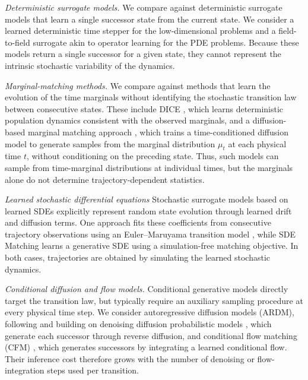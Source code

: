 \documentclass[oneside,11pt]{article}
\theoremstyle{remark}
\begin{document}
\emph{Deterministic surrogate models.}
We compare against deterministic surrogate models that learn a single successor state from the current state. We consider a learned deterministic time stepper \cite{otness2021an} for the low-dimensional problems and a field-to-field surrogate akin to operator learning \cite{stachenfeld2021learned} for the PDE problems. Because these models return a single successor for a given state, they cannot represent the intrinsic stochastic variability of the dynamics.

\emph{Marginal-matching methods.}
We compare against methods that learn the evolution of the time marginals without identifying the stochastic transition law between consecutive states. These include DICE \cite{blickhan-berman-stuart-etal:2025}, which learns deterministic population
dynamics consistent with the observed marginals, and a diffusion-based marginal matching approach \cite{ho2020denoising}, which trains a time-conditioned
diffusion model to generate samples from the marginal distribution $\mu_t$ at each
physical time $t$, without conditioning on the preceding state. Thus, such models can sample from time-marginal distributions at individual times, but the marginals alone do not determine trajectory-dependent statistics.

\emph{Learned stochastic differential equations}
Stochastic surrogate models based on learned SDEs explicitly represent random state evolution through learned drift and diffusion terms. One approach fits these coefficients from consecutive trajectory observations using an Euler--Maruyama transition model \cite{dridi2021learning}, while SDE Matching \cite{bartosh2025sdematching} learns a generative SDE using a simulation-free matching objective. In both cases, trajectories are obtained by simulating the learned stochastic dynamics.

\emph{Conditional diffusion and flow models.}
Conditional generative models directly target the transition law, but typically require an auxiliary sampling procedure at every physical time step. We consider autoregressive diffusion models (ARDM), following
\cite{KOHL2026108641} and building on denoising diffusion probabilistic models \cite{ho2020denoising}, which generate each successor through reverse diffusion, and conditional flow matching (CFM) \cite{albergo-vanden-eijnden:2022,lipman2023flow}, which generates successors by integrating a learned conditional flow. Their inference cost therefore grows with the number of denoising or flow-integration steps used per transition.
\end{document}
